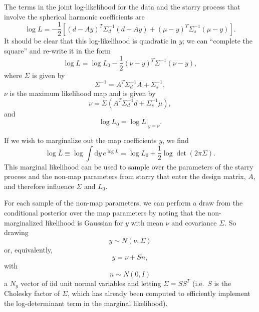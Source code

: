 \documentclass[modern]{aastex631}
\begin{document}
The terms in the joint log-likelihood for the data and the starry process that
involve the spherical harmonic coefficients are 
\begin{equation}
    \log L = -\frac{1}{2} \left[ \left( d - A y \right)^T \Sigma_d^{-1} \left( d - A y \right) + \left( \mu - y \right)^T \Sigma_s^{-1} \left( \mu - y \right) \right].
\end{equation}
It should be clear that this log-likelihood is quadratic in $y$; we can
``complete the square'' and re-write it in the form 
\begin{equation}
    \log L = \log L_0 - \frac{1}{2} \left( \nu - y \right)^T \Sigma^{-1} \left( \nu - y \right),
\end{equation}
where $\Sigma$ is given by 
\begin{equation}
    \Sigma^{-1} = A^T \Sigma_d^{-1} A + \Sigma_s^{-1},
\end{equation}
$\nu$ is the maximum likelihood map and is given by 
\begin{equation}
    \nu = \Sigma \left( A^T \Sigma_d^{-1} d + \Sigma_s^{-1} \mu \right),
\end{equation}
and 
\begin{equation}
    \log L_0 = \left. \log L \right|_{y = \nu}.
\end{equation}

If we wish to marginalize out the map coefficients $y$, we find 
\begin{equation}
    \log \bar{L} \equiv \log \int \mathrm{d} y \, e^{\log L} = \log L_0 + \frac{1}{2} \log \det \left( 2 \pi \Sigma \right).
\end{equation}
This marginal likelihood can be used to sample over the parameters of the starry
process and the non-map parameters from starry that enter the design matrix,
$A$, and therefore influence $\Sigma$ and $L_0$.

For each sample of the non-map parameters, we can perform a draw from the
conditional posterior over the map parameters by noting that the
non-marginalized likelihood is Gaussian for $y$ with mean $\nu$ and covariance
$\Sigma$.  So drawing 
\begin{equation}
    y \sim N\left( \nu, \Sigma \right)
\end{equation}
or, equivalently,
\begin{equation}
    y = \nu + S n,
\end{equation}
with 
\begin{equation}
    n \sim N(0, I)
\end{equation}
a $N_y$ vector of iid unit normal variables and letting $\Sigma = S S^T$ (i.e.\
$S$ is the Cholesky factor of $\Sigma$, which has already been computed to
efficiently implement the log-determinant term in the marginal likelihood).
\end{document}
